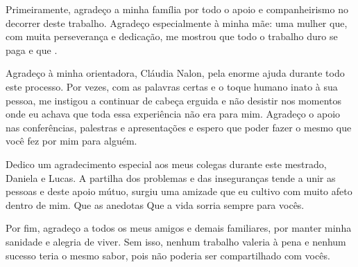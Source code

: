 Primeiramente, agradeço a minha família por todo o apoio e companheirismo no decorrer deste trabalho. Agradeço especialmente à minha mãe: uma mulher que, com muita perseverança e dedicação, me mostrou que todo o trabalho duro se paga e que .

Agradeço à minha orientadora, Cláudia Nalon, pela enorme ajuda durante todo este processo. Por vezes, com as palavras certas e o toque humano inato à sua pessoa, me instigou a continuar de cabeça erguida e não desistir nos momentos onde eu achava que toda essa experiência não era para mim. Agradeço o apoio nas conferências, palestras e apresentações e espero que poder fazer o mesmo que você fez por mim para alguém.

Dedico um agradecimento especial aos meus colegas durante este mestrado, Daniela e Lucas. A partilha dos problemas e das inseguranças tende a unir as pessoas e deste apoio mútuo, surgiu uma amizade que eu cultivo com muito afeto dentro de mim. Que as anedotas Que a vida sorria sempre para vocês.

Por fim, agradeço a todos os meus amigos e demais familiares, por manter minha sanidade e alegria de viver. Sem isso, nenhum trabalho valeria à pena e nenhum sucesso teria o mesmo sabor, pois não poderia ser compartilhado com vocês.